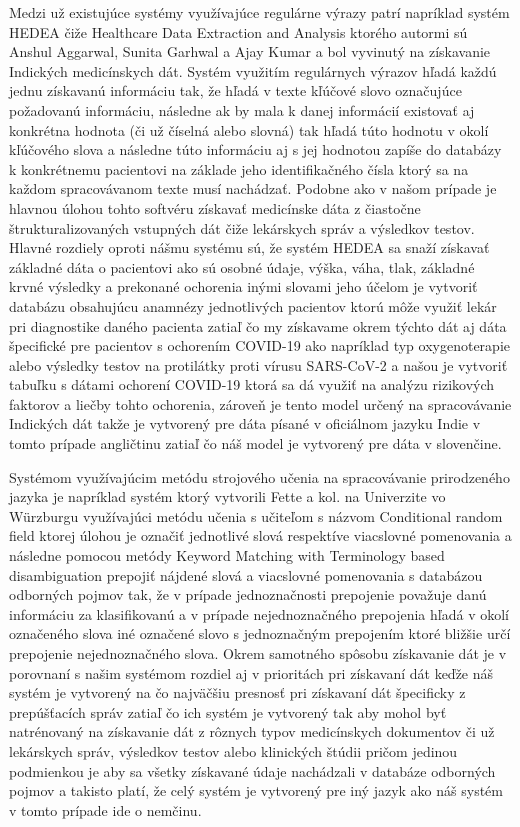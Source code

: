 Medzi už existujúce systémy využívajúce regulárne
výrazy patrí napríklad systém HEDEA \cite{hedea} čiže 
Healthcare Data Extraction and Analysis ktorého
autormi sú Anshul Aggarwal, Sunita Garhwal a Ajay Kumar 
a bol vyvinutý na získavanie Indických medicínskych dát.
Systém využitím regulárnych výrazov hľadá každú jednu
získavanú informáciu tak, že hľadá v texte kľúčové slovo
označujúce požadovanú informáciu, následne ak by mala 
k danej informácií existovať aj konkrétna hodnota
(či už číselná alebo slovná) tak hľadá túto hodnotu v okolí
kľúčového slova a následne túto informáciu aj 
s jej hodnotou zapíše do databázy k konkrétnemu 
pacientovi na základe jeho identifikačného
čísla ktorý sa na každom spracovávanom texte musí nachádzať. 
Podobne ako v našom prípade je hlavnou úlohou tohto 
softvéru získavať medicínske dáta z čiastočne štrukturalizovaných
vstupných dát čiže lekárskych správ a výsledkov testov.
Hlavné rozdiely oproti nášmu systému sú, že systém HEDEA
sa snaží získavať základné dáta o pacientovi ako sú osobné
údaje, výška, váha, tlak, základné krvné výsledky a 
prekonané ochorenia inými slovami jeho účelom je vytvoriť
databázu obsahujúcu anamnézy jednotlivých pacientov
ktorú môže využiť lekár pri diagnostike daného pacienta
zatiaľ čo my získavame okrem týchto dát aj dáta 
špecifické pre pacientov s ochorením COVID-19 ako
napríklad typ oxygenoterapie alebo výsledky testov
na protilátky proti vírusu SARS-CoV-2 a našou je 
vytvoriť tabuľku s dátami ochorení COVID-19 ktorá
sa dá využiť na analýzu rizikových faktorov a liečby
tohto ochorenia, zároveň je tento model určený na 
spracovávanie Indických dát
takže je vytvorený pre dáta písané v oficiálnom jazyku
Indie v tomto prípade angličtinu zatiaľ čo náš model
je vytvorený pre dáta v slovenčine.

Systémom využívajúcim metódu strojového učenia na
spracovávanie prirodzeného jazyka je napríklad 
systém ktorý vytvorili Fette a kol. na Univerzite
vo Würzburgu \cite{infExtGer} využívajúci metódu učenia s učiteľom 
s názvom Conditional random field \cite{CRF} ktorej úlohou
je označiť jednotlivé slová respektíve viacslovné
pomenovania a následne pomocou metódy 
Keyword Matching with Terminology based disambiguation
prepojiť nájdené slová a viacslovné pomenovania s databázou
odborných pojmov tak, že v prípade jednoznačnosti prepojenie 
považuje danú informáciu za klasifikovanú a v
prípade nejednoznačného prepojenia hľadá v okolí označeného slova
iné označené slovo s jednoznačným prepojením ktoré bližšie určí
prepojenie nejednoznačného slova. Okrem samotného spôsobu
získavanie dát je v porovnaní s našim systémom rozdiel 
aj v prioritách pri získavaní dát keďže náš systém 
je vytvorený na čo najväčšiu presnosť pri získavaní
dát špecificky z prepúšťacích správ zatiaľ čo ich 
systém je vytvorený tak aby mohol byť natrénovaný na získavanie
dát z rôznych typov medicínskych dokumentov či už
lekárskych správ, výsledkov testov alebo klinických 
štúdii pričom jedinou podmienkou je aby sa všetky získavané údaje 
nachádzali v databáze odborných pojmov a takisto platí, 
že celý systém je vytvorený 
pre iný jazyk ako náš systém v tomto prípade ide o 
nemčinu. 

